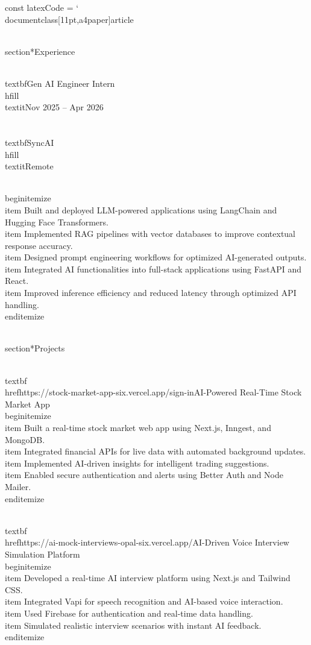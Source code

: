 const latexCode = `\\documentclass[11pt,a4paper]{article}
\begin{document}
\\section*{Experience}

\\textbf{Gen AI Engineer Intern} \\hfill \\textit{Nov 2025 -- Apr 2026} \\\\
\\textbf{SyncAI} \\hfill \\textit{Remote}

\\begin{itemize}
  \\item Built and deployed LLM-powered applications using LangChain and Hugging Face Transformers.
  \\item Implemented RAG pipelines with vector databases to improve contextual response accuracy.
  \\item Designed prompt engineering workflows for optimized AI-generated outputs.
  \\item Integrated AI functionalities into full-stack applications using FastAPI and React.
  \\item Improved inference efficiency and reduced latency through optimized API handling.
\\end{itemize}

\\section*{Projects}

\\textbf{\\href{https://stock-market-app-six.vercel.app/sign-in}{AI-Powered Real-Time Stock Market App}}
\\begin{itemize}
  \\item Built a real-time stock market web app using Next.js, Inngest, and MongoDB.
  \\item Integrated financial APIs for live data with automated background updates.
  \\item Implemented AI-driven insights for intelligent trading suggestions.
  \\item Enabled secure authentication and alerts using Better Auth and Node Mailer.
\\end{itemize}

\\textbf{\\href{https://ai-mock-interviews-opal-six.vercel.app/}{AI-Driven Voice Interview Simulation Platform}}
\\begin{itemize}
  \\item Developed a real-time AI interview platform using Next.js and Tailwind CSS.
  \\item Integrated Vapi for speech recognition and AI-based voice interaction.
  \\item Used Firebase for authentication and real-time data handling.
  \\item Simulated realistic interview scenarios with instant AI feedback.
\\end{itemize}
\end{document}
